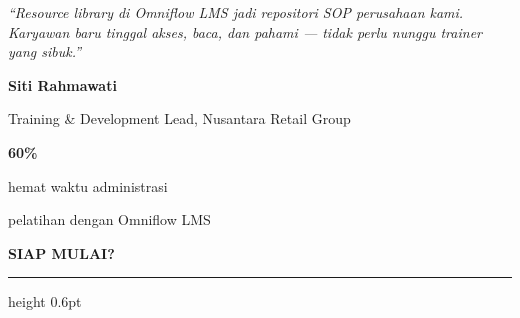 \documentclass[a4paper]{article}
\newcommand{\sectiontitle}[1]{%
    \vspace{10pt}%
    {\fontsize{13}{16}\selectfont\bfseries\color{BlueDark} #1}\par\vspace{3pt}%
    {\color{BluePrimary}\hrule height 0.6pt}\par\vspace{8pt}%
}
\begin{document}
\noindent
\begin{minipage}[t]{0.485\textwidth}
    \colorbox{BlueBg}{%
        \begin{minipage}{\dimexpr\linewidth-2\fboxsep\relax}
            \vspace{6pt}
            {\fontsize{9.5}{13}\selectfont\color{TextDark}\textit{``Resource library di Omniflow LMS jadi repositori SOP perusahaan kami. Karyawan baru tinggal akses, baca, dan pahami --- tidak perlu nunggu trainer yang sibuk.''}}\par\vspace{4pt}
            {\fontsize{8.5}{11}\selectfont\bfseries\color{BluePrimary} Siti Rahmawati}\par
            {\fontsize{8}{10}\selectfont\color{TextLight} Training \& Development Lead, Nusantara Retail Group}
            \vspace{6pt}
        \end{minipage}}
\end{minipage}%
\hfill
\begin{minipage}[t]{0.485\textwidth}
    \colorbox{BlueBg}{%
        \begin{minipage}{\dimexpr\linewidth-2\fboxsep\relax}
            \vspace{6pt}
            \begin{center}
                {\fontsize{20}{24}\selectfont\bfseries\color{VioletPrimary} 60\%}\par
                {\fontsize{9.5}{12}\selectfont\color{TextDark} hemat waktu administrasi}\par
                {\fontsize{9.5}{12}\selectfont\color{TextDark} pelatihan dengan Omniflow LMS}
            \end{center}
            \vspace{6pt}
        \end{minipage}}
\end{minipage}

\sectiontitle{SIAP MULAI?}
\end{document}
